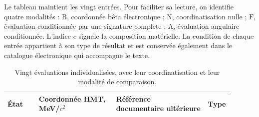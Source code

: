 Le tableau maintient les vingt entrées. Pour faciliter sa lecture, on
identifie quatre modalités : \(\mathrm{B}\), coordonnée bêta
électronique ; \(\mathrm{N}\), coordinatisation nulle ; \(\mathrm{F}\), évaluation
conditionnée par une signature complète ; \(\mathrm{A}\), évaluation angulaire
conditionnée. L’indice \(c\) signale la composition matérielle. La
condition de chaque entrée appartient à son type de résultat et est conservée
également dans le catalogue électronique qui accompagne le texte.


\begingroup
\small
\setlength{\tabcolsep}{3pt}
\begin{table}[!htbp]
\centering\fontsize{8.8}{10.2}\selectfont
\setlength{\tabcolsep}{4pt}\renewcommand{\arraystretch}{1.04}
\caption{Vingt évaluations individualisées, avec leur coordinatisation et leur modalité de comparaison.
}
\label{tab:vi-evaluaciones-veinte}
\begin{tabular}{p{0.13\linewidth}p{0.32\linewidth}p{0.38\linewidth}p{0.07\linewidth}}

\toprule
État
 & Coordonnée HMT, MeV/\(c^2\)
 & Référence documentaire ultérieure
 & Type
\\
\midrule


\end{tabular}
\end{table}
